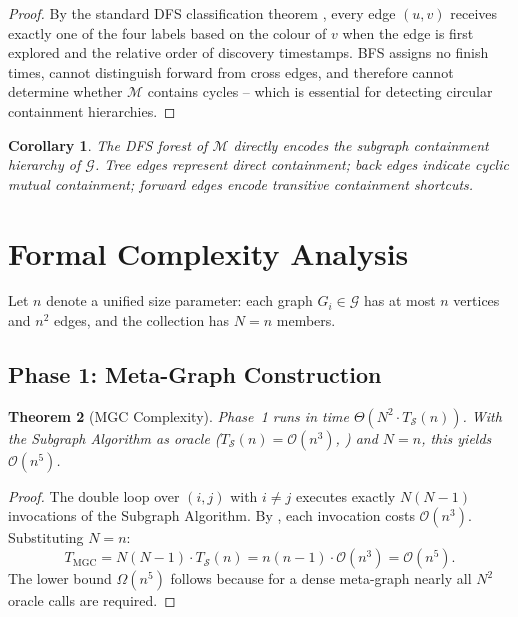 ﻿\documentclass[12pt,a4paper]{article}
\theoremstyle{plain}
\newtheorem{theorem}{Theorem}[section]
\newtheorem{corollary}[theorem]{Corollary}
\theoremstyle{definition}
\theoremstyle{remark}
\begin{document}
	\begin{proof}
		By the standard DFS classification theorem \cite[Ch.~22]{cormen2009}, every
		edge $(u,v)$ receives exactly one of the four labels based on the colour of
		$v$ when the edge is first explored and the relative order of discovery
		timestamps.  BFS assigns no finish times, cannot distinguish forward from
		cross edges, and therefore cannot determine whether $\mathcal{M}$ contains
		cycles -- which is essential for detecting circular containment hierarchies.
	\end{proof}
	
	\begin{corollary}
		The DFS forest of $\mathcal{M}$ directly encodes the \emph{subgraph
			containment hierarchy} of $\mathcal{G}$.  Tree edges represent direct
		containment; back edges indicate cyclic mutual containment; forward edges
		encode transitive containment shortcuts.
	\end{corollary}
	
	\section{Formal Complexity Analysis}
	\label{sec:complexity}
	
	Let $n$ denote a unified size parameter: each graph $G_i \in \mathcal{G}$ has
	at most $n$ vertices and $n^2$ edges, and the collection has $N = n$ members.
	
	\subsection{Phase 1: Meta-Graph Construction}
	
	\begin{theorem}[MGC Complexity]
		\label{thm:mgc}
		Phase~1 runs in time $\Theta(N^2 \cdot T_{\mathcal{S}}(n))$.
		With the Subgraph Algorithm as oracle
		($T_{\mathcal{S}}(n) = \mathcal{O}(n^3)$, )
		and $N = n$, this yields $\mathcal{O}(n^5)$.
	\end{theorem}
	
	\begin{proof}
		The double loop over $(i,j)$ with $i \neq j$ executes exactly
		$N(N-1)$ invocations of the Subgraph Algorithm.
		By , each invocation costs
		$\mathcal{O}(n^3)$.  Substituting $N = n$:
		\[
		T_{\text{MGC}} = N(N-1) \cdot T_{\mathcal{S}}(n)
		= n(n-1) \cdot \mathcal{O}(n^3)
		= \mathcal{O}(n^5).
		\]
		The lower bound $\Omega(n^5)$ follows because for a dense meta-graph
		nearly all $N^2$ oracle calls are required.
	\end{proof}
	
\end{document}
